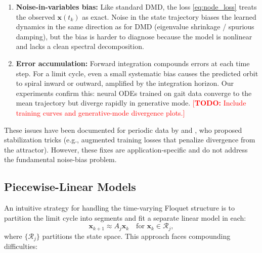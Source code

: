 \documentclass[12pt]{article}
\newcommand{\todo}[1]{\textcolor{red}{[\textbf{TODO:} #1]}}
\begin{document}
\begin{enumerate}[label=(\roman*)]
  \item \textbf{Noise-in-variables bias:} Like standard DMD, the loss
  \cref{eq:node_loss} treats the observed $\bm{x}(t_k)$ as exact. Noise
  in the state trajectory biases the learned dynamics in the same
  direction as for DMD (eigenvalue shrinkage / spurious damping), but
  the bias is harder to diagnose because the model is nonlinear and
  lacks a clean spectral decomposition.

  \item \textbf{Error accumulation:} Forward integration compounds
  errors at each time step. For a limit cycle, even a small systematic
  bias causes the predicted orbit to spiral inward or outward,
  amplified by the integration horizon. Our experiments confirm this:
  neural ODEs trained on gait data converge to the mean trajectory but
  diverge rapidly in generative mode.
  \todo{Include training curves and generative-mode divergence plots.}
\end{enumerate}

These issues have been documented for periodic data by
\citet{jordan2021neural} and \citet{linot2023stabilized}, who proposed
stabilization tricks (e.g., augmented training losses that penalize
divergence from the attractor). However, these fixes are
application-specific and do not address the fundamental noise-bias
problem.

\subsection{Piecewise-Linear Models}
\label{sec:piecewise}

An intuitive strategy for handling the time-varying Floquet structure is
to partition the limit cycle into segments and fit a separate linear model
in each:
\begin{equation}
  \bm{x}_{k+1} \approx A_j \bm{x}_k \quad \text{for } \bm{x}_k \in \mathcal{R}_j,
  \label{eq:piecewise}
\end{equation}
where $\{\mathcal{R}_j\}$ partitions the state space. This approach faces
compounding difficulties:
\end{document}
